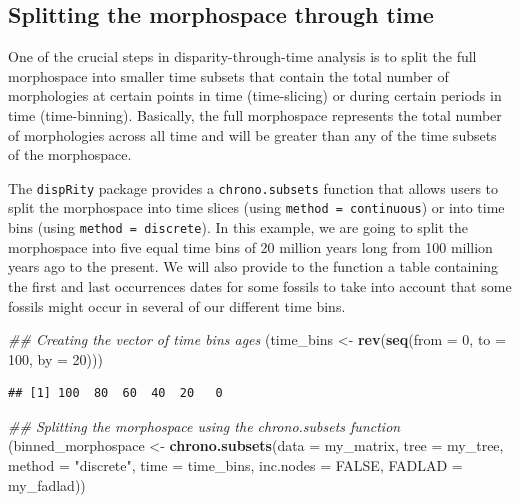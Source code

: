 \documentclass[]{book}
\newenvironment{Shaded}{\begin{snugshade}}{\end{snugshade}}
\newcommand{\CommentTok}[1]{\textcolor[rgb]{0.56,0.35,0.01}{\textit{#1}}}
\newcommand{\DataTypeTok}[1]{\textcolor[rgb]{0.13,0.29,0.53}{#1}}
\newcommand{\DecValTok}[1]{\textcolor[rgb]{0.00,0.00,0.81}{#1}}
\newcommand{\KeywordTok}[1]{\textcolor[rgb]{0.13,0.29,0.53}{\textbf{#1}}}
\newcommand{\NormalTok}[1]{#1}
\newcommand{\OtherTok}[1]{\textcolor[rgb]{0.56,0.35,0.01}{#1}}
\newcommand{\StringTok}[1]{\textcolor[rgb]{0.31,0.60,0.02}{#1}}
\begin{document}
\hypertarget{splitting-the-morphospace-through-time}{%
\subsection{Splitting the morphospace through time}\label{splitting-the-morphospace-through-time}}

One of the crucial steps in disparity-through-time analysis is to split the full morphospace into smaller time subsets that contain the total number of morphologies at certain points in time (time-slicing) or during certain periods in time (time-binning).
Basically, the full morphospace represents the total number of morphologies across all time and will be greater than any of the time subsets of the morphospace.

The \texttt{dispRity} package provides a \texttt{chrono.subsets} function that allows users to split the morphospace into time slices (using \texttt{method\ =\ continuous}) or into time bins (using \texttt{method\ =\ discrete}).
In this example, we are going to split the morphospace into five equal time bins of 20 million years long from 100 million years ago to the present.
We will also provide to the function a table containing the first and last occurrences dates for some fossils to take into account that some fossils might occur in several of our different time bins.

\begin{Shaded}
\begin{Highlighting}[]
\CommentTok{## Creating the vector of time bins ages}
\NormalTok{(time_bins <-}\StringTok{ }\KeywordTok{rev}\NormalTok{(}\KeywordTok{seq}\NormalTok{(}\DataTypeTok{from =} \DecValTok{0}\NormalTok{, }\DataTypeTok{to =} \DecValTok{100}\NormalTok{, }\DataTypeTok{by =} \DecValTok{20}\NormalTok{)))}
\end{Highlighting}
\end{Shaded}

\begin{verbatim}
## [1] 100  80  60  40  20   0
\end{verbatim}

\begin{Shaded}
\begin{Highlighting}[]
\CommentTok{## Splitting the morphospace using the chrono.subsets function}
\NormalTok{(binned_morphospace <-}\StringTok{ }\KeywordTok{chrono.subsets}\NormalTok{(}\DataTypeTok{data =}\NormalTok{ my_matrix, }\DataTypeTok{tree =}\NormalTok{ my_tree,}
    \DataTypeTok{method =} \StringTok{"discrete"}\NormalTok{, }\DataTypeTok{time =}\NormalTok{ time_bins, }\DataTypeTok{inc.nodes =} \OtherTok{FALSE}\NormalTok{,}
    \DataTypeTok{FADLAD =}\NormalTok{ my_fadlad))}
\end{Highlighting}
\end{Shaded}
\end{document}
